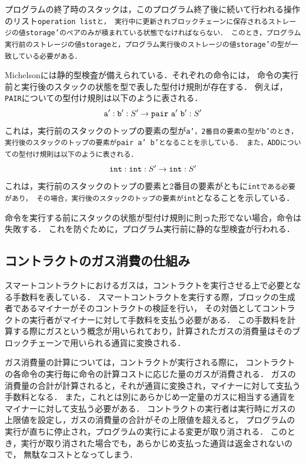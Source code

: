\documentclass{kuisthesis}
\begin{document}
プログラムの終了時のスタックは，このプログラム終了後に続いて行われる操作のリスト{\tt operation listと，
実行中に更新されブロックチェーンに保存されるストレージの値storage'のペアのみが積まれている状態でなければならない．
このとき，プログラム実行前のストレージの値storageと，プログラム実行後のストレージの値storage'の型が一致している必要がある．}

Michelsonには静的型検査が備えられている．それぞれの命令には，
命令の実行前と実行後のスタックの状態を型で表した型付け規則が存在する．
例えば，{\tt PAIR}についての型付け規則は以下のように表される．
\begin{displaymath}
  {\tt a' : b'} : S' \rightarrow {\tt pair\ a'\ b'} : S'
\end{displaymath}
これは，実行前のスタックのトップの要素の型が{\tt a'，2番目の要素の型がb'のとき，
実行後のスタックのトップの要素がpair a' b'となることを示している．
また，ADDについての型付け規則は以下のように表される．}
\begin{displaymath}
  {\tt int : int} : S' \rightarrow {\tt int} : S'
\end{displaymath}
これは，実行前のスタックのトップの要素と2番目の要素がともに{\tt intである必要があり，
その場合，実行後のスタックのトップの要素がint}となることを示している．

命令を実行する前にスタックの状態が型付け規則に則った形でない場合，命令は失敗する．
これを防ぐために，プログラム実行前に静的な型検査が行われる．

\subsection{コントラクトのガス消費の仕組み}\label{subsec-pre-gas}
スマートコントラクトにおけるガスは，コントラクトを実行させる上で必要となる手数料を表している．
スマートコントラクトを実行する際，ブロックの生成者であるマイナーがそのコントラクトの検証を行い，
その対価としてコントラクトの実行者がマイナーに対して手数料を支払う必要がある．
この手数料を計算する際にガスという概念が用いられており，計算されたガスの消費量はそのブロックチェーンで用いられる通貨に変換される．


ガス消費量の計算については，コントラクトが実行される際に，
コントラクトの各命令の実行毎に命令の計算コストに応じた量のガスが消費される．
ガスの消費量の合計が計算されると，それが通貨に変換され，マイナーに対して支払う手数料となる．
また，これとは別にあらかじめ一定量のガスに相当する通貨をマイナーに対して支払う必要がある．
コントラクトの実行者は実行時にガスの上限値を設定し，ガスの消費量の合計がその上限値を超えると，
プログラムの実行が直ちに停止され，プログラムの実行による変更が取り消される．
このとき，実行が取り消された場合でも，あらかじめ支払った通貨は返金されないので，
無駄なコストとなってしまう．
\end{document}
